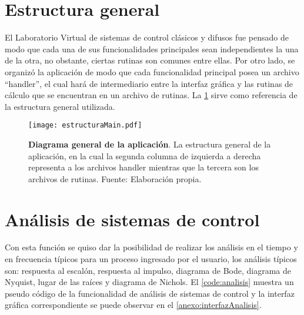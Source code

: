 \section{Estructura general}

    El Laboratorio Virtual de sistemas de control clásicos y difusos fue pensado de modo que cada una de sus funcionalidades principales sean independientes la una de la otra, no obstante, ciertas rutinas son comunes entre ellas. Por otro lado, se organizó la aplicación de modo que cada funcionalidad principal posea un archivo \enquote{handler}, el cual hará de intermediario entre la interfaz gráfica y las rutinas de cálculo que se encuentran en un archivo de rutinas. La \cref{fig:estructuraMain} sirve como referencia de la estructura general utilizada.

    \begin{figure}[htb]
        \centering
        \texttt{[image: estructuraMain.pdf]}
        \caption[Diagrama general de la aplicación]{\textbf{Diagrama general de la aplicación}. La estructura general de la aplicación, en la cual la segunda columna de izquierda a derecha representa a los archivos handler mientras que la tercera son los archivos de rutinas. Fuente: Elaboración propia.} 
        \label{fig:estructuraMain}
    \end{figure}

\section{Análisis de sistemas de control}
    
    Con esta función se quiso dar la posibilidad de realizar los análisis en el tiempo y en frecuencia típicos para un proceso ingresado por el usuario, los análisis típicos son: respuesta al escalón, respuesta al impulso, diagrama de Bode, diagrama de Nyquist, lugar de las raíces y diagrama de Nichols. El \cref{code:analisis} muestra un pseudo código de la funcionalidad de análisis de sistemas de control y la interfaz gráfica correspondiente se puede observar en el \ref{anexo:interfazAnalisis}.

